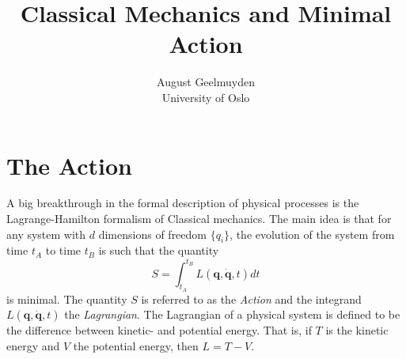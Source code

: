 \documentclass[twoside,utf8]{article}
\title{
\fontsize{22pt}{10pt}\selectfont
Classical Mechanics and Minimal Action } %
\author{
\large
August Geelmuyden
\\[2mm] %
\normalsize
University of Oslo \\ %
}
\date{}
\begin{document}
\maketitle %


\section{The Action}
A big breakthrough in the formal description of physical processes is the Lagrange-Hamilton formalism of Classical mechanics. The main idea is that for any system with $d$ dimensions of freedom $\{q_i\}$, the evolution of the system from time $t_A$ to time $t_B$ is such that the quantity
\[
S = \int_{t_A}^{t_B} L(\mathbf{q},\dot{\mathbf{q}},t)dt
\]
is minimal. The quantity $S$ is referred to as the {\it Action} and the integrand $L(\mathbf{q},\dot{\mathbf{q}},t)$ the {\it Lagrangian}. The Lagrangian of a physical system is defined to be the difference between kinetic- and potential energy. That is, if $T$ is the kinetic energy and $V$ the potential energy, then $L=T-V$.

%
\end{document}
